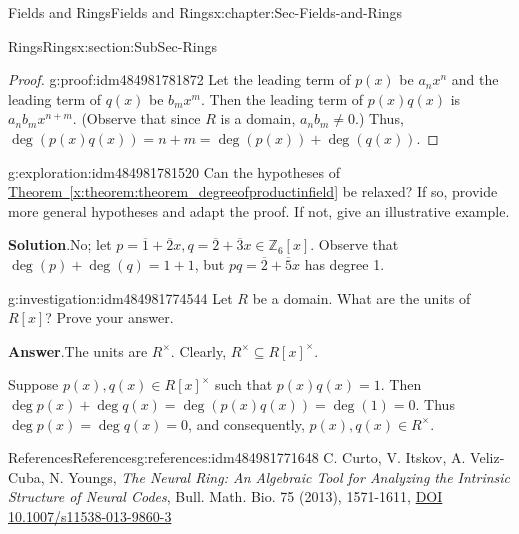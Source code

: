 \documentclass[oneside,10pt,]{book}
\newcommand{\blocktitlefont}{\relax}
\newcommand{\xreffont}{\relax}
\numberwithin{equation}{section}
\def\Z{{\mathbb Z}}
\begin{document}
\begin{chapterptx}{Fields and Rings}{}{Fields and Rings}{}{}{x:chapter:Sec-Fields-and-Rings}
\begin{sectionptx}{Rings}{}{Rings}{}{}{x:section:SubSec-Rings}
\begin{proof}{}{g:proof:idm484981781872}
Let the leading term of \(p(x)\) be \(a_n x^n\) and the leading term of \(q(x)\) be \(b_m x^m\). Then the leading term of \(p(x) q(x)\) is \(a_n b_m x^{n+m}\). (Observe that since \(R\) is a domain, \(a_n b_m \ne 0\).) Thus, \(\deg(p(x) q(x)) = n+m = \deg(p(x)) + \deg(q(x))\).%
\end{proof}
\begin{exploration}{}{g:exploration:idm484981781520}%
Can the hypotheses of \hyperref[x:theorem:theorem_degreeofproductinfield]{Theorem~{\xreffont\ref{x:theorem:theorem_degreeofproductinfield}}} be relaxed? If so, provide more general hypotheses and adapt the proof. If not, give an illustrative example.%
\par\smallskip%
\noindent\textbf{\blocktitlefont Solution}.\hypertarget{g:solution:idm484981776320}{}\quad{}No; let \(p = \overline{1} + \overline{2}x, q = \overline{2} + \overline{3}x\in \Z_6[x]\). Observe that \(\deg(p) + \deg(q) = 1 + 1\), but \(pq = \overline{2} + \overline{5}x\) has degree 1.%
\end{exploration}
\begin{investigation}{}{g:investigation:idm484981774544}%
Let \(R\) be a domain. What are the units of \(R[x]\)? Prove your answer.%
\par\smallskip%
\noindent\textbf{\blocktitlefont Answer}.\hypertarget{g:answer:idm484981773088}{}\quad{}The units are \(R^\times\). Clearly, \(R^\times\subseteq R[x]^\times\).%
\par
Suppose \(p(x),q(x)\in R[x]^\times\) such that \(p(x) q(x) = 1\). Then \(\deg p(x) + \deg q(x) = \deg(p(x) q(x)) = \deg(1) = 0\). Thus \(\deg p(x) = \deg q(x) = 0\), and consequently, \(p(x),q(x)\in R^\times\).%
\end{investigation}
%
%
\typeout{************************************************}
\typeout{************************************************}
%
\begin{references-subsection-numberless}{References}{}{References}{}{}{g:references:idm484981771648}
C. Curto, V. Itskov, A. Veliz-Cuba, N. Youngs, \emph{The Neural Ring: An Algebraic Tool for Analyzing the Intrinsic Structure of Neural Codes}, Bull. Math. Bio. 75 (2013), 1571-1611, \href{https://doi.org/10.1007/s11538-013-9860-3}{DOI 10.1007\slash{}s11538-013-9860-3}\end{references-subsection-numberless}
\end{sectionptx}
%
%
\typeout{************************************************}

\end{chapterptx}
\end{document}

